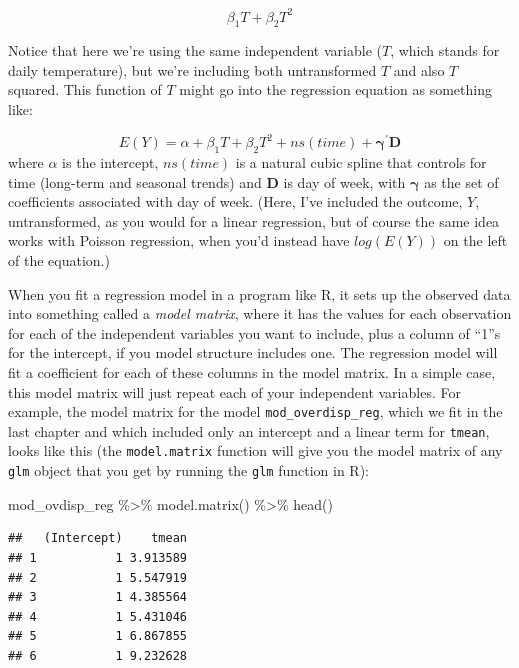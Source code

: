 \documentclass[
]{book}
\newenvironment{Shaded}{\begin{snugshade}}{\end{snugshade}}
\newcommand{\FunctionTok}[1]{\textcolor[rgb]{0.00,0.00,0.00}{#1}}
\newcommand{\NormalTok}[1]{#1}
\newcommand{\SpecialCharTok}[1]{\textcolor[rgb]{0.00,0.00,0.00}{#1}}
\begin{document}
\[
\beta_1 T + \beta_2 T^2
\]

Notice that here we're using the same independent variable (\(T\), which stands for daily
temperature), but we're including both untransformed \(T\) and also \(T\) squared. This function
of \(T\) might go into the regression equation as something like:

\[
E(Y) = \alpha + \beta_1 T + \beta_2 T^2 + ns(time) + \mathbf{\gamma^{'}D}
\]
where \(\alpha\) is the intercept, \(ns(time)\) is a natural cubic spline that controls for
time (long-term and seasonal trends) and \(\mathbf{D}\) is day of week, with \(\mathbf{\gamma}\) as
the set of coefficients associated with day of week. (Here, I've included the outcome,
\(Y\), untransformed, as you would for a linear regression, but of course the same idea
works with Poisson regression, when you'd instead have \(log(E(Y))\) on the left of the
equation.)

When you fit a regression model in a program like R, it sets up the observed data into
something called a \emph{model matrix}, where it has the values for each observation for each of
the independent variables you want to include, plus a column of ``1''s for the intercept, if you
model structure includes one. The regression model will fit a coefficient
for each of these columns in the model matrix. In a simple case, this model matrix will just
repeat each of your independent variables. For example, the model matrix for the model
\texttt{mod\_overdisp\_reg}, which we fit in the last chapter and which included only an intercept
and a linear term for \texttt{tmean}, looks like this (the \texttt{model.matrix} function will give you
the model matrix of any \texttt{glm} object that you get by running the \texttt{glm} function in R):

\begin{Shaded}
\begin{Highlighting}[]
\NormalTok{mod\_ovdisp\_reg }\SpecialCharTok{\%\textgreater{}\%} 
  \FunctionTok{model.matrix}\NormalTok{() }\SpecialCharTok{\%\textgreater{}\%} 
  \FunctionTok{head}\NormalTok{()}
\end{Highlighting}
\end{Shaded}

\begin{verbatim}
##   (Intercept)    tmean
## 1           1 3.913589
## 2           1 5.547919
## 3           1 4.385564
## 4           1 5.431046
## 5           1 6.867855
## 6           1 9.232628
\end{verbatim}
\end{document}
